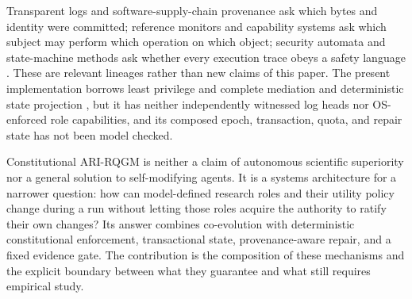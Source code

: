 Transparent logs and software-supply-chain provenance ask which bytes and
identity were committed; reference monitors and capability systems ask
which subject may perform which operation on which object; security
automata and state-machine methods ask whether every execution trace obeys
a safety language \cite{schneider2000enforceable}. These are relevant lineages rather than new claims of
this paper. The present implementation borrows least privilege and complete
mediation \cite{saltzer1975protection} and deterministic state projection
\cite{schneider1990implementing}, but it has neither independently witnessed
log heads nor OS-enforced role capabilities, and its composed epoch,
transaction, quota, and repair state has not been model checked.

Constitutional ARI-RQGM is neither a claim of autonomous scientific
superiority nor a general solution to self-modifying agents. It is a
systems architecture for a narrower question: how can model-defined
research roles and their utility policy change during a run without
letting those roles acquire the authority to ratify their own changes?
Its answer combines co-evolution with deterministic constitutional
enforcement, transactional state, provenance-aware repair, and a fixed
evidence gate. The contribution is the composition of these mechanisms
and the explicit boundary between what they guarantee and what still
requires empirical study.
